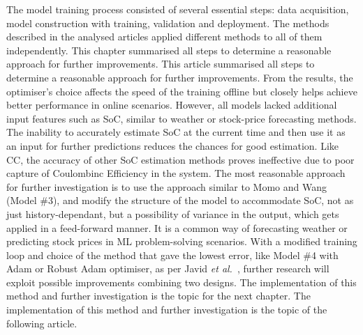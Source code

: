 %
%
The model training process consisted of several essential steps: data acquisition, model construction with training, validation and deployment.
The methods described in the analysed articles applied different methods to all of them independently.
 {
This chapter summarised all steps to determine a reasonable approach for further improvements.
} {
This article summarised all steps to determine a reasonable approach for further improvements.
}
From the results, the optimiser's choice affects the speed of the training offline but closely helps achieve better performance in online scenarios.
However, all models lacked additional input features such as SoC, similar to weather or stock-price forecasting methods.
The inability to accurately estimate SoC at the current time and then use it as an input for further predictions reduces the chances for good estimation.
Like CC, the accuracy of other SoC estimation methods proves ineffective due to poor capture of Coulombinc Efficiency in the system.
The most reasonable approach for further investigation is to use the approach similar to Momo and Wang\cite{mamo_long_2020} (Model \#3), and modify the structure of the model to accommodate SoC, not as just history-dependant, but a possibility of variance in the output, which gets applied in a feed-forward manner. 
It is a common way of forecasting weather or predicting stock prices in ML problem-solving scenarios.
With a modified training loop and choice of the method that gave the lowest error, like Model \#4 with Adam or Robust Adam optimiser, as per Javid \textit{et al.}~\cite{javid_adaptive_2020}, further research will exploit possible improvements combining two designs.
 {
The implementation of this method and further investigation is the topic for the next chapter.
} {
The implementation of this method and further investigation is the topic of the following article.
}